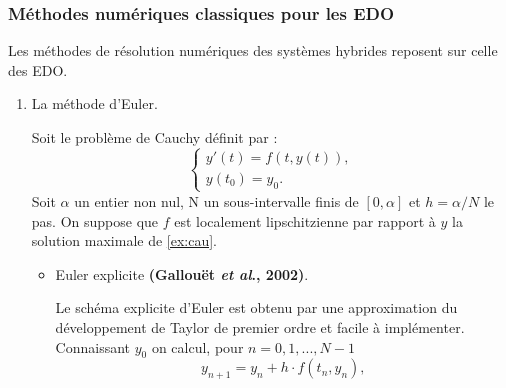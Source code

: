 \documentclass[12pt, oneside]{report} %
\theoremstyle{definition}
\newtheorem{defn}{\textbf{Définition}}[section]
\theoremstyle{remark}
\begin{document}
	\subsubsection*{Méthodes numériques classiques pour les EDO}
	Les méthodes de résolution numériques des systèmes hybrides reposent sur celle des EDO. 
	\begin{enumerate}
		\item {La méthode d'Euler}.\
		
		Soit le problème de Cauchy définit par : 
		\begin{equation}\label{ex:cau}
			\begin{cases}
				y'(t) = f(t,y(t)), \\
				y(t_0) = y_0.
			\end{cases}
		\end{equation}
		Soit $\alpha$ un entier non nul, N un sous-intervalle finis de $[0, \alpha]$ et $h = \alpha/N$ le pas.
		On suppose que $f$ est localement lipschitzienne par rapport à $y$ la solution maximale de \eqref{ex:cau}. 
		
		\begin{itemize}
			\item {Euler explicite} \textbf{(Gallouët \textit{et al}., 2002)}.
			
		Le schéma explicite d'Euler est obtenu par une approximation du développement de Taylor de premier ordre et facile à implémenter. Connaissant $y_0$ on calcul, pour $n = 0, 1, ... , N-1$ 
\begin{equation}
	\label{f:eulerexplicite}
	y_{n+1} = y_n + h \cdot f(t_n, y_n),
\end{equation}
			
			

\end{itemize}
\end{enumerate}
\end{document}
